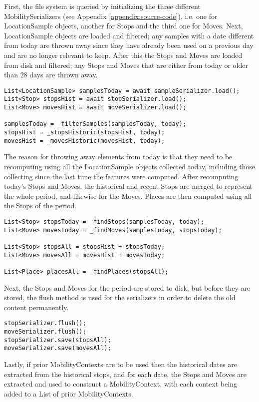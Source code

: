 First, the file system is queried by initializing the three different MobilitySerializers (see Appendix \ref{appendix:source-code}), i.e. one for LocationSample objects, another for Stops and the third one for Moves. Next, LocationSample objects are loaded and filtered; any samples with a date different from today are thrown away since they have already been used on a previous day and are no longer relevant to keep. After this the Stops and Moves are loaded from disk and filtered; any Stops and Moves that are either from today or older than 28 days are thrown away.

\begin{verbatim}
List<LocationSample> samplesToday = await sampleSerializer.load();
List<Stop> stopsHist = await stopSerializer.load();
List<Move> movesHist = await moveSerializer.load();

samplesToday = _filterSamples(samplesToday, today);
stopsHist = _stopsHistoric(stopsHist, today);
movesHist = _movesHistoric(movesHist, today);
\end{verbatim}

The reason for throwing away elements from today is that they need to be recomputing using all the LocationSample objects collected today, including those collecting since the last time the features were computed. After recomputing today's Stops and Moves, the historical and recent Stops are merged to represent the whole period, and likewise for the Moves. Places are then computed using all the Stops of the period.

\begin{verbatim}
List<Stop> stopsToday = _findStops(samplesToday, today);
List<Move> movesToday = _findMoves(samplesToday, stopsToday);

List<Stop> stopsAll = stopsHist + stopsToday;
List<Move> movesAll = movesHist + movesToday;

List<Place> placesAll = _findPlaces(stopsAll);
\end{verbatim}

Next, the Stops and Moves for the period are stored to disk, but before they are stored, the flush method is used for the serializers in order to delete the old content permanently.
\begin{verbatim}
stopSerializer.flush();
moveSerializer.flush();
stopSerializer.save(stopsAll);
moveSerializer.save(movesAll);
\end{verbatim}

Lastly, if prior MobilityContexts are to be used then the historical dates are extracted from the historical stops, and for each date, the Stops and Moves are extracted and used to construct a MobilityContext, with each context being added to a List of prior MobilityContexts.

